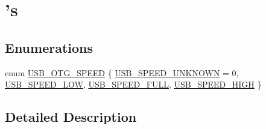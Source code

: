 \hypertarget{group___internal___macro}{\section{'s}
\label{group___internal___macro}
}
\subsection*{Enumerations}
\begin{DoxyCompactItemize}
\item 
enum \hyperlink{group___internal___macro_ga5cb546411f61c7a89e7e9e2b7baf9296}{U\-S\-B\-\_\-\-O\-T\-G\-\_\-\-S\-P\-E\-E\-D} \{ \hyperlink{group___internal___macro_gga5cb546411f61c7a89e7e9e2b7baf9296ac9755ae6b86f8148054fd6a342c74acc}{U\-S\-B\-\_\-\-S\-P\-E\-E\-D\-\_\-\-U\-N\-K\-N\-O\-W\-N} = 0, 
\hyperlink{group___internal___macro_gga5cb546411f61c7a89e7e9e2b7baf9296a0ec4f8f66feaf7ee8f2ee618302e9470}{U\-S\-B\-\_\-\-S\-P\-E\-E\-D\-\_\-\-L\-O\-W}, 
\hyperlink{group___internal___macro_gga5cb546411f61c7a89e7e9e2b7baf9296a0f17d0b9928086c6114fea73e08f1780}{U\-S\-B\-\_\-\-S\-P\-E\-E\-D\-\_\-\-F\-U\-L\-L}, 
\hyperlink{group___internal___macro_gga5cb546411f61c7a89e7e9e2b7baf9296a57eeede6d769b09c01ac9c9c62fef8c9}{U\-S\-B\-\_\-\-S\-P\-E\-E\-D\-\_\-\-H\-I\-G\-H}
 \}
\end{DoxyCompactItemize}


\subsection{Detailed Description}


